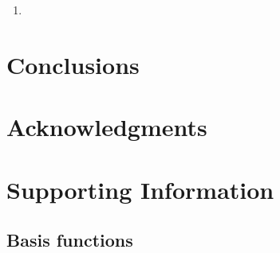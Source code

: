 \documentclass[11pt,a4paper]{article}
\begin{document}
\begin{enumerate}
	\item 
\end{enumerate}

\section{Conclusions}

\section{Acknowledgments}

\section{Supporting Information}

\subsection{Basis functions}
\end{document}
